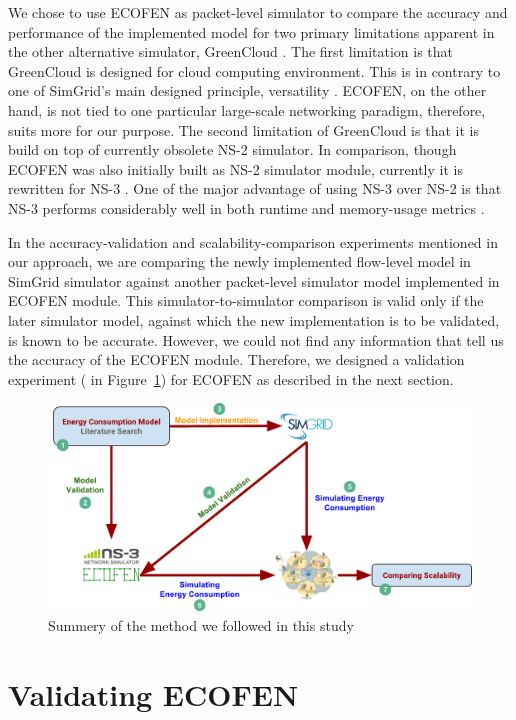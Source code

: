 We chose to use ECOFEN as packet-level simulator to compare the accuracy and performance of the implemented model for two primary limitations apparent in the other alternative simulator, GreenCloud \cite{DBLP:journals/tjs/KliazovichBK12}. The first limitation is that GreenCloud is designed for cloud computing environment. This is in contrary to one of SimGrid's main designed principle, versatility \cite{DBLP:journals/jpdc/CasanovaGLQS14}. ECOFEN, on the other hand, is not tied to one particular large-scale networking paradigm, therefore, suits more for our purpose. The second limitation of GreenCloud is that it is build on top of currently obsolete NS-2 simulator. In comparison, though ECOFEN was also initially built as NS-2 simulator module, currently it is rewritten for NS-3 \cite{DBLP:conf/cloudnet/CorneaOL14}. One of the major advantage of using NS-3 over NS-2 is that NS-3 performs considerably well in both runtime and memory-usage metrics \cite{DBLP:conf/icc/WeingartnerLW09}.

In the accuracy-validation and scalability-comparison experiments mentioned in our approach, we are comparing the newly implemented flow-level model in SimGrid simulator against another packet-level simulator model implemented in ECOFEN module. This simulator-to-simulator comparison is valid only if the later simulator model, against which the new implementation is to be validated, is known to be accurate. However, we could not find any information that tell us the accuracy of the ECOFEN module. Therefore, we designed a validation experiment ( in Figure~\ref{fig:approach}) for ECOFEN as described in the next section. 

\begin{figure}[ht]
	\begin{center}
		\includegraphics[width=16cm]{images/approach.pdf}
		\caption{Summery of the method we followed in this study}
		\label{fig:approach}
	\end{center}
\end{figure}
\section{Validating ECOFEN}
 